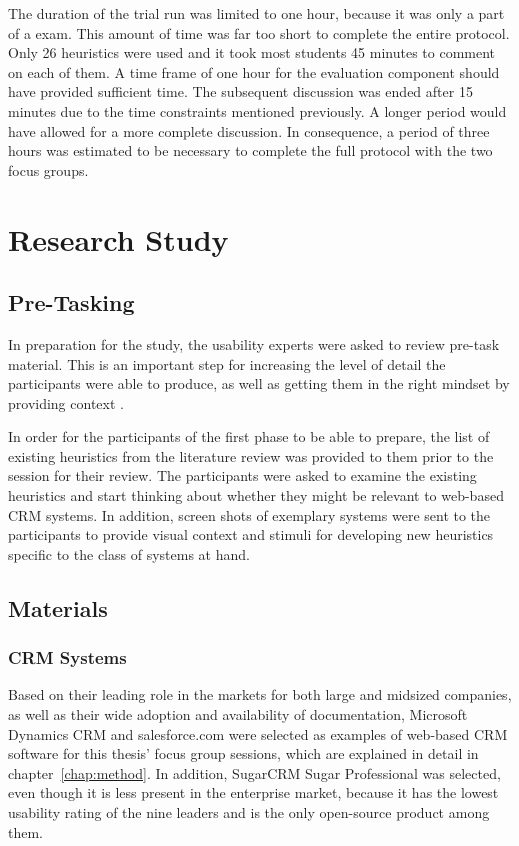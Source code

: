 The duration of the trial run was limited to one hour, because it was only a part of a exam. This amount of time was far too short to complete the entire protocol. Only 26 heuristics were used and it took most students 45 minutes to comment on each of them. A time frame of one hour for the evaluation component should have provided sufficient time. The subsequent discussion was ended after 15 minutes due to the time constraints mentioned previously. A longer period would have allowed for a more complete discussion. In consequence, a period of three hours was estimated to be necessary to complete the full protocol with the two focus groups.

\section{Research Study}
\subsection{Pre-Tasking}
In preparation for the study, the usability experts were asked to review pre-task material. This is an important step for increasing the level of detail the participants were able to produce, as well as getting them in the right mindset by providing context \citep[p.\ 164]{Cooper2011}.

In order for the participants of the first phase to be able to prepare, the list of existing heuristics from the literature review was provided to them prior to the session for their review. The participants were asked to examine the existing heuristics and start thinking about whether they might be relevant to web-based CRM systems. In addition, screen shots of exemplary systems were sent to the participants to provide visual context and stimuli for developing new heuristics specific to the class of systems at hand.

\subsection{Materials}
\label{sec:materials}
\subsubsection{CRM Systems}
\label{sec:selected_systems}
Based on their leading role in the markets for both large and midsized companies, as well as their wide adoption and availability of documentation, Microsoft Dynamics CRM and salesforce.com were selected as examples of web-based CRM software for this thesis' focus group sessions, which are explained in detail in chapter~\ref{chap:method}. In addition, SugarCRM Sugar Professional was selected, even though it is less present in the enterprise market, because it has the lowest usability rating of the nine leaders and is the only open-source product among them.

